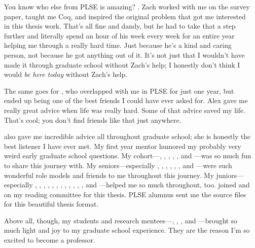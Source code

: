 You know who else from PLSE is amazing? .
Zach worked with me on the survey paper, taught me Coq, and inspired the original problem that got me interested in this thesis work.
That's all fine and dandy, but he had to take that a step further and literally spend an hour of his week every week
for an entire year helping me through a really hard time.
Just because he's a kind and caring person, not because he got anything out of it.
It's not just that I wouldn't have made it through graduate school without Zach's help;
I honestly don't think I would \textit{be here today} without Zach's help.

The same goes for , who overlapped with me in PLSE for just one year,
but ended up being one of the best friends I could have ever asked for.
Alex gave me really great advice when life was really hard.
Some of that advice saved my life.
That's cool; you don't find friends like that just anywhere.

 also gave me incredible advice all throughout graduate school; she is honestly the best listener I have ever met.
My first year mentor  humored my probably very weird early graduate school questions.
My cohort---, , , , 
, and ---was so much fun to share this journey with.
My seniors---especially , , , , , 
, and ---were such wonderful role models and friends to me throughout this journey.
My juniors---especially , , ,
, %
, %
, %
, %
, %
, %
,
,
,
and ---helped me so much throughout, too.
 joined  and  on my reading committee for this thesis.
PLSE alumnus  sent me the source files for this beautiful thesis format.

Above all, though, my students and research mentees---, , , and ---brought
so much light and joy to my graduate school experience.
They are the reason I'm so excited to become a professor.


